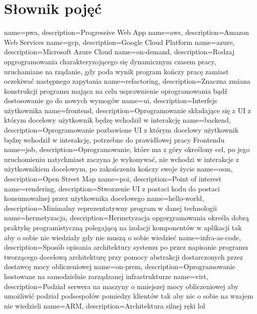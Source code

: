 \usepackage{glossaries}

\section{Słownik pojęć}
\label{sec:slownik-pojec}

name={pwa}, description={Progressive Web App}
name={aws}, description={Amazon Web Services}
name={gcp}, description={Google Cloud Platform}
name={azure}, description={Microsoft Azure Cloud}
name={on-demand}, description={Rodzaj opgrogramowania charakteryzojącego się dynamicznym czasem pracy, uruchamiane na rządanie, gdy poda wynik program kończy pracę zamiast oczekiwać następnego zapytania}
name={refactoring}, description={Znaczna zmiana konstrukcji programu mająca na celu usprawnienie oprogramowania bądź dostosowanie go do nowych wymogów}
name={ui}, description={Interfejs użytkownika}
name={frontend}, description={Oprogramowanie składające się z UI z którym docelowy użytkownik będzę wchodził w interakcję}
name={backend}, description={Oprogramowanie pozbawione UI z którym docelowy użytkownik będzę wchodził w interakcję, potrzebne do prawidłowej pracy Frontendu}
name={job}, description={Oprogramowanie, które ma z góry określony cel, po jego uruchomieniu natychmiast zaczyna je wykonywać, nie wchodzi w interakcje z użytkownikiem docelowym, po zakończeniu kończy swoje życie}
name={osm}, description={Open Street Map}
name={poi}, description={Point of interest}
name={rendering}, description={Stworzenie UI z postaci kodu do postaci konsumowalnej przez użytkownika docelowego}
name={hello-world}, description={Minimalny reprezentatywny program w danej technologii}
name={hermetyzacja}, description={Hermetyzacja opgorgramowania określa dobrą praktykę programistyczną polegającą na izolacji komponentów w aplikacji tak aby o sobie nie wiedziały gdy nie muszą o sobie wiedzieć}
name={infra-as-code}, description={Sposób opisania architektury systemu po przez napisanie programu tworzącego docelową architekturę przy pomocy abstrakcji dostarczonych przez dostawcę mocy obliczeniowej}
name={on-prem}, description={Oprogramowanie hostowane na samodzielnie zarządzanej infrastrukturze}
name={virt}, description={Podział serwera na maszyny o mniejszej mocy obliczeniowej aby umożliwić podział podsespołów pomiedzy klientów tak aby nic o sobie na wzajem nie wiedzieli}
name={ARM}, description={Architektura silnej ręki lol}

\makeglossaries


